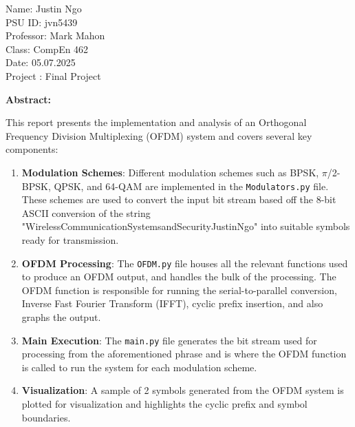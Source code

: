 \documentclass[letterpaper, 11pt]{article}
\def\class{CompEn 462}
\def\homeworkNumber{Final Project}
\def\date{05.07.2025}
\def\professor{Mark Mahon}
\newcommand{\secHeader}[1]{\vspace{2mm} \noindent \textbf{#1:}\vspace{-4mm}}
\begin{document}
\hfill
\newline
Name: Justin Ngo
\\PSU ID: jvn5439
\\Professor: \professor
\\Class: \class
\\Date: \date
\\Project : \homeworkNumber

\newpage
\secHeader{Abstract}
\vspace{5mm}

This report presents the implementation and analysis of an Orthogonal Frequency Division Multiplexing (OFDM) system and 
covers several key components:

\begin{enumerate}
    \item \textbf{Modulation Schemes}: Different modulation schemes such as BPSK, $\pi$/2-BPSK, QPSK, and 64-QAM are implemented in the 
    \texttt{Modulators.py} file. These schemes are used to convert the input bit stream based off the 8-bit ASCII conversion of the string "WirelessCommunicationSystemsandSecurityJustinNgo"
    into suitable symbols ready for transmission.

    \item \textbf{OFDM Processing}: The \texttt{OFDM.py} file houses all the relevant functions used to produce an OFDM output, and handles the bulk of the processing.
    The OFDM function is responsible for running the serial-to-parallel conversion, Inverse Fast Fourier Transform (IFFT), cyclic prefix insertion, and also graphs the output.

    \item \textbf{Main Execution}: The \texttt{main.py} file generates the bit stream used for processing from the aforementioned phrase and is where the OFDM function is called 
    to run the system for each modulation scheme.

    \item \textbf{Visualization}: A sample of 2 symbols generated from the OFDM system is plotted for visualization and highlights the cyclic prefix and symbol boundaries. 
\end{enumerate}
\end{document}
